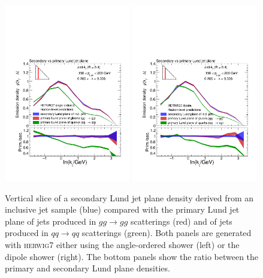 \documentclass[a4paper,11pt]{article}
\newcommand{\hw}{{\textsc{herwig}}7\xspace}
\begin{document}
\begin{figure}
    \centering
    \includegraphics[width = 0.49\textwidth]{secondaryVsPrimary_herwig7Angular_quarksAndGluons.pdf}
    \includegraphics[width = 0.49\textwidth]{secondaryVsPrimary_herwig7Dipole_quarksAndGluons.pdf}
    \caption{Vertical slice of a secondary Lund jet plane density derived from an inclusive jet sample (blue) compared with the primary Lund jet plane of jets produced in $gg\to gg$ scatterings (red) and of jets produced in $qq\to qq$ scatterings (green). Both panels are generated with \hw either using the angle-ordered shower (left) or the dipole shower (right). The bottom panels show the ratio between the primary and secondary Lund plane densities.}
    \label{fig:secLP-vs-gg}
\end{figure}
\end{document}
